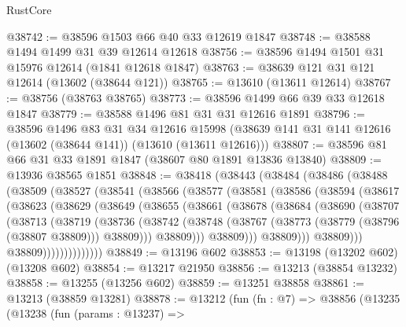 \begin{lexlean}{RustCore}
\begin{coremodule}
@38742 := @38596 @1503 @66 @40 @33 @12619 @1847
@38748 := @38588 @1494 @1499 @31 @39 @12614 @12618
@38756 := @38596 @1494 @1501 @31 @15976 @12614 (@1841 @12618 @1847)
@38763 := @38639 @121 @31 @121 @12614 (@13602 (@38644 @121))
@38765 := @13610 (@13611 @12614)
@38767 := @38756 (@38763 @38765)
@38773 := @38596 @1499 @66 @39 @33 @12618 @1847
@38779 := @38588 @1496 @81 @31 @31 @12616 @1891
@38796 := @38596
    @1496
    @83
    @31
    @34
    @12616
    @15998
    (@38639 @141 @31 @141 @12616 (@13602 (@38644 @141)) (@13610 (@13611 @12616)))
@38807 := @38596 @81 @66 @31 @33 @1891 @1847 (@38607 @80 @1891 @13836 @13840)
@38809 := @13936 @38565 @1851
@38848 := @38418
    (@38443
      (@38484
        (@38486
          (@38488
            (@38509
              (@38527
                (@38541
                  (@38566
                    (@38577
                      (@38581
                        (@38586
                          (@38594
                            (@38617
                              (@38623
                                (@38629
                                  (@38649
                                    (@38655
                                      (@38661
                                        (@38678
                                          (@38684
                                            (@38690
                                              (@38707
                                                (@38713
                                                  (@38719
                                                    (@38736
                                                      (@38742
                                                        (@38748
                                                          (@38767
                                                            (@38773
                                                              (@38779 (@38796 (@38807 @38809)))
                                                              @38809)))
                                                        @38809)))
                                                  @38809)))
                                            @38809)))
                                      @38809)))
                                @38809))))))))))))))
@38849 := @13196 @602
@38853 := @13198 (@13202 @602) (@13208 @602)
@38854 := @13217 @21950
@38856 := @13213 (@38854 @13232)
@38858 := @13255 (@13256 @602)
@38859 := @13251 @38858
@38861 := @13213 (@38859 @13281)
@38878 := @13212
    (fun (fn : @7) =>
    @38856
      (@13235
        (@13238
          (fun (params : @13237) =>

\end{coremodule}
\end{lexlean}
